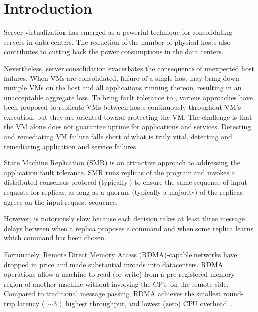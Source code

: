 \section{Introduction} \label{sec:intro}


Server virtualization has emerged as a powerful technique for consolidating servers in 
data centers. The reduction of the number of physical hosts also contributes to cutting 
back the power consumptions in the data centers.

Nevertheless, server consolidation exacerbates the consequence of unexpected host failures. 
When VMs are consolidated, failure of a single host may bring down mutiple VMs on the host 
and all applications running thereon, resulting in an unacceptable aggregate loss. 
To bring fault tolerance to , various approaches have been 
proposed to replicate VMs between hosts continuously throughout VM's execution, but they are
oriented toward protecting the VM. The challenge is that the VM alone does not guarantee uptime 
for applications and services. Detecting and remediating VM failure falls short of what is 
truly vital, detecting and remediating application and service failures.

State Machine Replication (SMR) is an attractive approach to addressing the application fault 
tolerance. SMR runs replicas of the program and invokes a distributed consensus protocol 
(typically \paxos) to ensure the same sequence of input requests for replicas, as long as a 
quorum (typically a majority) of the replicas agrees on the input request sequence.

However, \paxos is notoriously slow because each decision takes at least 
three message delays between when a replica proposes a command and when some replica learns which 
command has been chosen.

Fortunately, Remote Direct Memory Access (RDMA)-capable networks have dropped in price and made 
substantial inroads into datacenters. RDMA operations allow a machine to read (or write) from a 
pre-registered memory region of another machine without involving the CPU on the remote side. 
Compared to traditional message passing, RDMA achieves the smallest round-trip latency 
(~$\sim$3 \us), highest throughput, and lowest (zero) CPU overhead~\cite{pilaf:usenix14}.


